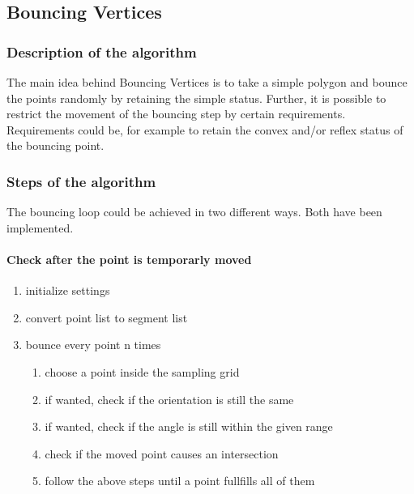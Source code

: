 \subsection{Bouncing Vertices}
\subsubsection{Description of the algorithm}
The main idea behind Bouncing Vertices is to take a simple polygon and
bounce the points randomly by retaining the simple status. Further, it
is possible to restrict the movement of the bouncing step by certain
requirements. Requirements could be, for example to retain the convex
and/or reflex status of the bouncing point.

\subsubsection{Steps of the algorithm}

The bouncing loop could be achieved in two different ways. Both have been
implemented.

\paragraph{Check after the point is temporarly moved}
\begin{enumerate}
  \item initialize settings
  \item convert point list to segment list
  \item bounce every point n times
  \begin{enumerate}
    \item choose a point inside the sampling grid
    \item if wanted, check if the orientation is still the same
    \item if wanted, check if the angle is still within the given range
    \item check if the moved point causes an intersection
    \item follow the above steps until a point fullfills all of them
  \end{enumerate}
\end{enumerate}

